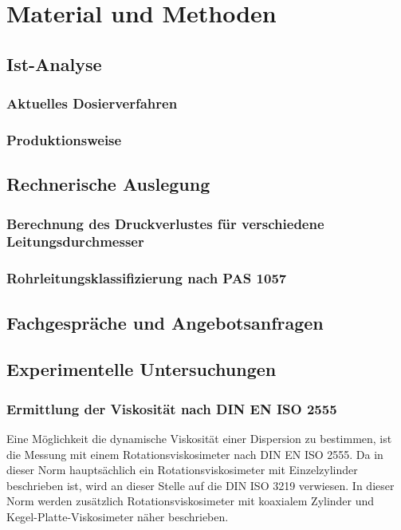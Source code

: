 \section{Material und Methoden}
\label{sec:durchführung}

\subsection{Ist-Analyse}
\subsubsection{Aktuelles Dosierverfahren}
\subsubsection{Produktionsweise}
\subsection{Rechnerische Auslegung}
\subsubsection{Berechnung des Druckverlustes für verschiedene Leitungsdurchmesser}
\subsubsection{Rohrleitungsklassifizierung nach PAS 1057}
\subsection{Fachgespräche und Angebotsanfragen}

\subsection{Experimentelle Untersuchungen}
\subsubsection{Ermittlung der Viskosität nach DIN EN ISO 2555}
Eine Möglichkeit die dynamische Viskosität einer Dispersion zu bestimmen, ist die Messung mit einem Rotationsviskosimeter nach DIN EN ISO 2555. Da in dieser Norm hauptsächlich ein Rotationsviskosimeter mit Einzelzylinder beschrieben ist, wird an dieser Stelle auf die DIN ISO 3219 verwiesen. In dieser Norm werden zusätzlich Rotationsviskosimeter mit koaxialem Zylinder und Kegel-Platte-Viskosimeter näher beschrieben. \cite{DINDeutschesInstitutfurNormunge.V..Februar2013, DINDeutschesInstitutfurNormunge.V..September2018} \\

